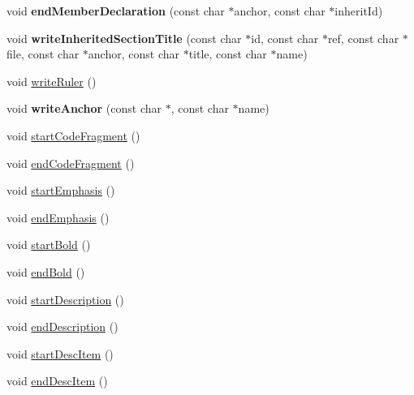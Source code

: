 \begin{DoxyCompactItemize}
\item 
\mbox{\label{class_html_generator_a9b8cedda7c063179e583296294606469}} 
void {\bfseries end\+Member\+Declaration} (const char $\ast$anchor, const char $\ast$inherit\+Id)
\item 
\mbox{\label{class_html_generator_a125754fb3b5f8986ed030a33e8d53de0}} 
void {\bfseries write\+Inherited\+Section\+Title} (const char $\ast$id, const char $\ast$ref, const char $\ast$file, const char $\ast$anchor, const char $\ast$title, const char $\ast$name)
\item 
void \mbox{\hyperlink{class_html_generator_aa8f5d1eab68eb5fd43f2529c947f0a02}{write\+Ruler}} ()
\item 
\mbox{\label{class_html_generator_a9bc82a247269f9294be37a72460f5ff8}} 
void {\bfseries write\+Anchor} (const char $\ast$, const char $\ast$name)
\item 
void \mbox{\hyperlink{class_html_generator_ac071e1f57eb6e4b2d4baeae1723186bd}{start\+Code\+Fragment}} ()
\item 
void \mbox{\hyperlink{class_html_generator_a6df6ede2137490c79228b9825df3b263}{end\+Code\+Fragment}} ()
\item 
void \mbox{\hyperlink{class_html_generator_afa50b0bc75a1f73eb0e86d4718534d1b}{start\+Emphasis}} ()
\item 
void \mbox{\hyperlink{class_html_generator_a88c2f4c34f00161d34e4c1059d747381}{end\+Emphasis}} ()
\item 
void \mbox{\hyperlink{class_html_generator_a4785d0f1ac1828284aa1f21dbb1e3773}{start\+Bold}} ()
\item 
void \mbox{\hyperlink{class_html_generator_a8e60c605c5db7577e2e0256c0431dcb1}{end\+Bold}} ()
\item 
void \mbox{\hyperlink{class_html_generator_a8ae03ee5e64d705aeebbe605d3c05b0f}{start\+Description}} ()
\item 
void \mbox{\hyperlink{class_html_generator_aff598e78fc1ebaefb21fe94fda564e4d}{end\+Description}} ()
\item 
void \mbox{\hyperlink{class_html_generator_a7a4d4ef015bc9d8298a6c023f85737c5}{start\+Desc\+Item}} ()
\item 
void \mbox{\hyperlink{class_html_generator_a0354681e6d39ae7da41d33f88656e335}{end\+Desc\+Item}} ()
\item 
\mbox{\label{class_html_generator_a760684d94139338dc683a816a6d59e3d}} 

\end{DoxyCompactItemize}
